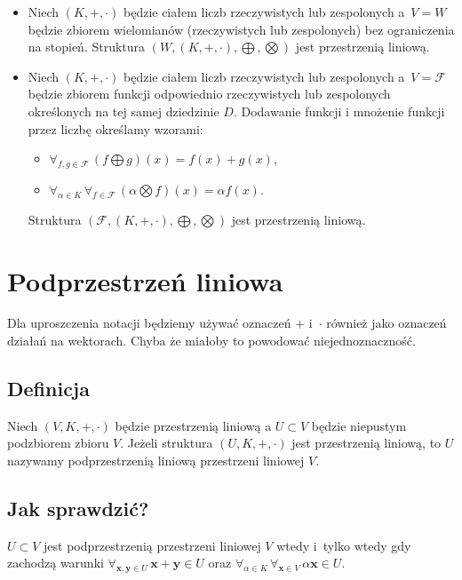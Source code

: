 \documentclass{article}
\begin{document}
\begin{itemize}
    \item Niech $(K,+,\cdot)$ będzie ciałem liczb rzeczywistych lub zespolonych a~$V=W$ będzie zbiorem wielomianów (rzeczywistych lub zespolonych) bez ograniczenia na stopień.
        Struktura $(W,(K,+,\cdot), \bigoplus, \bigotimes)$ jest przestrzenią liniową.

    \item Niech $(K,+,\cdot)$ będzie ciałem liczb rzeczywistych lub zespolonych a~$V=\mathcal{F}$ będzie zbiorem funkcji odpowiednio rzeczywistych lub zespolonych określonych na tej samej dziedzinie $D$.
        Dodawanie funkcji i mnożenie funkcji przez liczbę określamy wzorami:
        \begin{itemize}
            \item $\forall_{f,g \in \mathcal{F}}\,(f \bigoplus g)(x) = f(x) + g(x)$,
            \item $\forall_{\alpha \in K}\,\forall_{f \in \mathcal{F}}\,(\alpha \bigotimes f)(x) = \alpha f(x)$.
        \end{itemize}
        Struktura $(\mathcal{F} ,(K,+,\cdot), \bigoplus, \bigotimes)$ jest przestrzenią liniową.
\end{itemize}

\section{Podprzestrzeń liniowa}
Dla uproszczenia notacji będziemy używać oznaczeń $+$ i~$\cdot$ również jako oznaczeń działań na wektorach.
Chyba że miałoby to powodować niejednoznaczność.

\subsection{Definicja}
Niech $(V, K, +, \cdot)$ będzie przestrzenią liniową a $U \subset V$ będzie niepustym podzbiorem zbioru $V$.
Jeżeli struktura $(U, K, +, \cdot)$ jest przestrzenią liniową, to $U$ nazywamy podprzestrzenią liniową przestrzeni liniowej $V$.

\subsection{Jak sprawdzić?}
$U \subset V$ jest podprzestrzenią przestrzeni liniowej $V$ wtedy i~tylko wtedy gdy zachodzą warunki $\forall_{\mathbf{x},\mathbf{y} \in U}\, \mathbf{x}+\mathbf{y} \in U$ oraz $\forall_{\alpha \in K}\, \forall_{\mathbf{x}\in V}\,\alpha \mathbf{x} \in U$.
\end{document}
